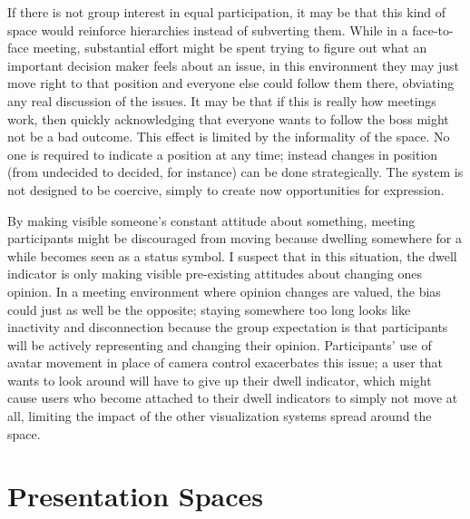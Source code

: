 If there is not group interest in equal participation, it may be that this kind of space would reinforce hierarchies instead of subverting them. While in a face-to-face meeting, substantial effort might be spent trying to figure out what an important decision maker feels about an issue, in this environment they may just move right to that position and everyone else could follow them there, obviating any real discussion of the issues. It may be that if this is really how meetings work, then quickly acknowledging that everyone wants to follow the boss might not be a bad outcome. This effect is limited by the informality of the space. No one is required to indicate a position at any time; instead changes in position (from undecided to decided, for instance) can be done strategically. The system is not designed to be coercive, simply to create now opportunities for expression. 

By making visible someone's constant attitude about something, meeting participants might be discouraged from moving because dwelling somewhere for a while becomes seen as a status symbol. I suspect that in this situation, the dwell indicator is only making visible pre-existing attitudes about changing ones opinion. In a meeting environment where opinion changes are valued, the bias could just as well be the opposite; staying somewhere too long looks like inactivity and disconnection because the group expectation is that participants will be actively representing and changing their opinion. Participants' use of avatar movement in place of camera control exacerbates this issue; a user that wants to look around will have to give up their dwell indicator, which might cause users who become attached to their dwell indicators to simply not move at all, limiting the impact of the other visualization systems spread around the space. 




\section{Presentation Spaces}


